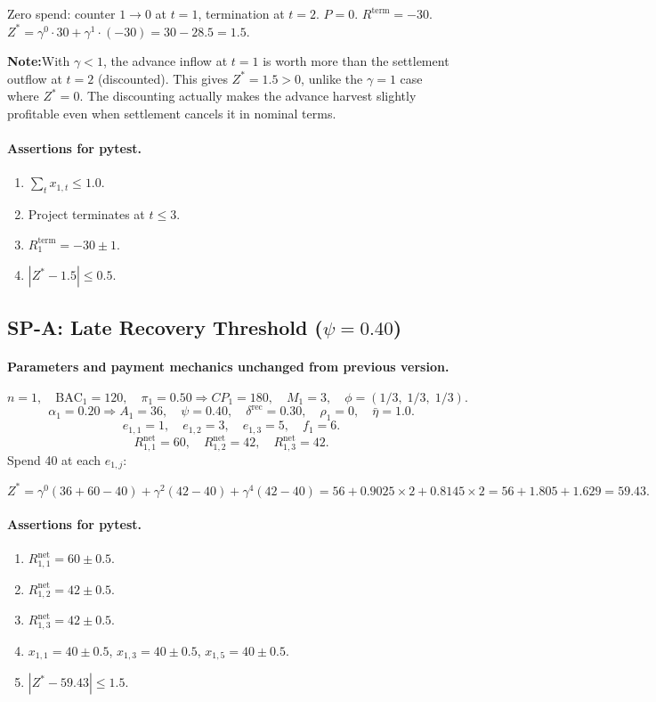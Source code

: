 \documentclass[11pt, a4paper]{article}
\newcommand{\NOTEH}{\textcolor{noteblu}{\bfseries Note:}\quad}
\newcommand{\BAC}{\mathrm{BAC}}
\begin{document}
Zero spend: counter $1\to0$ at $t=1$, termination at $t=2$.
$P=0$. $R^{\mathrm{term}}=-30$. $Z^*=\gamma^0\cdot30+\gamma^1\cdot(-30)
=30-28.5=\mathbf{1.5}$.

\begin{notebox}
\NOTEH With $\gamma<1$, the advance inflow at $t=1$ is worth more than
the settlement outflow at $t=2$ (discounted). This gives $Z^*=1.5>0$,
unlike the $\gamma=1$ case where $Z^*=0$. The discounting actually
makes the advance harvest slightly profitable even when settlement
cancels it in nominal terms.
\end{notebox}

\paragraph{Assertions for pytest.}
\begin{enumerate}[label=A\arabic*.]
  \item $\sum_t x_{1,t}\leq1.0$.
  \item Project terminates at $t\leq3$.
  \item $R_1^{\mathrm{term}}=-30\pm1$.
  \item $|Z^*-1.5|\leq0.5$.
\end{enumerate}

\subsection{SP-A: Late Recovery Threshold ($\psi=0.40$)}

\paragraph{Parameters and payment mechanics unchanged from previous
version.}
\[
  n=1,\quad\BAC_1=120,\quad\pi_1=0.50\Rightarrow CP_1=180,\quad
  M_1=3,\quad\phi=(1/3,\;1/3,\;1/3).
\]
\[
  \alpha_1=0.20\Rightarrow A_1=36,\quad\psi=0.40,\quad
  \delta^{\mathrm{rec}}=0.30,\quad\rho_1=0,\quad\bar\eta=1.0.
\]
\[
  e_{1,1}=1,\quad e_{1,2}=3,\quad e_{1,3}=5,\quad f_1=6.
\]
\[
  R_{1,1}^{\mathrm{net}}=60,\quad R_{1,2}^{\mathrm{net}}=42,\quad
  R_{1,3}^{\mathrm{net}}=42.
\]
Spend 40 at each $e_{1,j}$:

\[
  Z^* = \gamma^0(36+60-40)+\gamma^2(42-40)+\gamma^4(42-40)
      = 56 + 0.9025\times2 + 0.8145\times2
      = 56+1.805+1.629 = \mathbf{59.43}.
\]

\paragraph{Assertions for pytest.}
\begin{enumerate}[label=A\arabic*.]
  \item $R_{1,1}^{\mathrm{net}}=60\pm0.5$.
  \item $R_{1,2}^{\mathrm{net}}=42\pm0.5$.
  \item $R_{1,3}^{\mathrm{net}}=42\pm0.5$.
  \item $x_{1,1}=40\pm0.5$, $x_{1,3}=40\pm0.5$, $x_{1,5}=40\pm0.5$.
  \item $|Z^*-59.43|\leq1.5$.
\end{enumerate}
\end{document}
